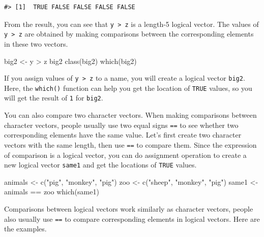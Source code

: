 \documentclass[
]{book}
\newenvironment{Shaded}{\begin{snugshade}}{\end{snugshade}}
\newcommand{\FunctionTok}[1]{\textcolor[rgb]{0.00,0.00,0.00}{#1}}
\newcommand{\NormalTok}[1]{#1}
\newcommand{\OtherTok}[1]{\textcolor[rgb]{0.56,0.35,0.01}{#1}}
\newcommand{\SpecialCharTok}[1]{\textcolor[rgb]{0.00,0.00,0.00}{#1}}
\newcommand{\StringTok}[1]{\textcolor[rgb]{0.31,0.60,0.02}{#1}}
\begin{document}
\begin{verbatim}
#> [1]  TRUE FALSE FALSE FALSE FALSE
\end{verbatim}

From the result, you can see that \texttt{y\ \textgreater{}\ z} is a length-5 logical vector. The values of \texttt{y\ \textgreater{}\ z} are obtained by making comparisons between the corresponding elements in these two vectors.

\begin{Shaded}
\begin{Highlighting}[]
\NormalTok{big2 }\OtherTok{\textless{}{-}}\NormalTok{ y }\SpecialCharTok{\textgreater{}}\NormalTok{ z}
\NormalTok{big2}
\FunctionTok{class}\NormalTok{(big2)}
\FunctionTok{which}\NormalTok{(big2)}
\end{Highlighting}
\end{Shaded}

If you assign values of \texttt{y\ \textgreater{}\ z} to a name, you will create a logical vector \texttt{big2}. Here, the \texttt{which()} function can help you get the location of \texttt{TRUE} values, so you will get the result of \texttt{1} for \texttt{big2}.

You can also compare two character vectors. When making comparisons between character vectors, people usually use two equal signs \texttt{==} to see whether two corresponding elements have the same value. Let's first create two character vectors with the same length, then use \texttt{==} to compare them. Since the expression of comparison is a logical vector, you can do assignment operation to create a new logical vector \texttt{same1} and get the locations of \texttt{TRUE} values.

\begin{Shaded}
\begin{Highlighting}[]
\NormalTok{animals }\OtherTok{\textless{}{-}} \FunctionTok{c}\NormalTok{(}\StringTok{"pig"}\NormalTok{, }\StringTok{"monkey"}\NormalTok{, }\StringTok{"pig"}\NormalTok{)}
\NormalTok{zoo }\OtherTok{\textless{}{-}} \FunctionTok{c}\NormalTok{(}\StringTok{"sheep"}\NormalTok{, }\StringTok{"monkey"}\NormalTok{, }\StringTok{"pig"}\NormalTok{)}
\NormalTok{same1 }\OtherTok{\textless{}{-}}\NormalTok{ animals }\SpecialCharTok{==}\NormalTok{ zoo}
\FunctionTok{which}\NormalTok{(same1)}
\end{Highlighting}
\end{Shaded}

Comparisons between logical vectors work similarly as character vectors, people also usually use \texttt{==} to compare corresponding elements in logical vectors. Here are the examples.
\end{document}
